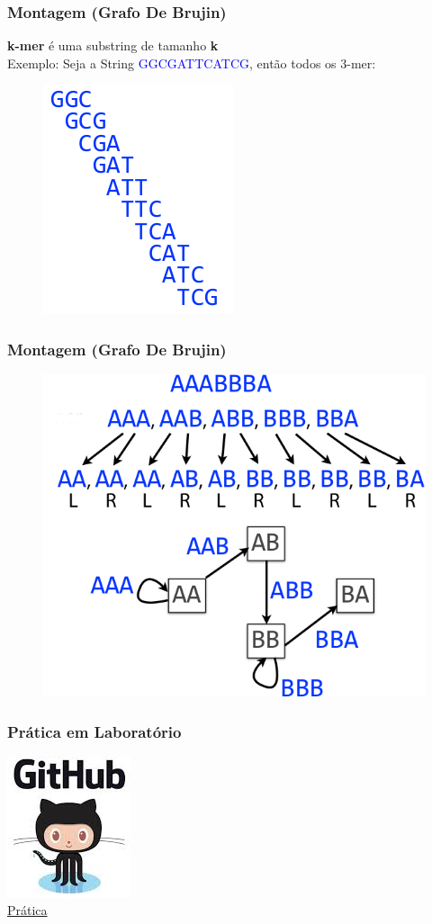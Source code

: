 \documentclass{beamer}
\begin{document}
		\begin{frame}\frametitle{Montagem (Grafo De Brujin)}
			\textbf{k-mer} é uma substring de tamanho \textbf{k}\\
			Exemplo: Seja a String \textcolor{blue}{GGCGATTCATCG}, então todos os 3-mer:
			\begin{figure}[ht]
				\centering
				\includegraphics[width=.34\textwidth]{img/3-mer.png}
			\end{figure}
		\end{frame}
	
		\begin{frame}\frametitle{Montagem (Grafo De Brujin)}
		\begin{figure}[ht]
			\centering
			\includegraphics[width=.75\textwidth]{img/debrujinresume.png}
		\end{figure}
		\end{frame}
	
		\begin{frame}\frametitle{Prática em Laboratório}
		\centering
		\href{https://github.com/waldeyr/bsb2018}{\includegraphics[scale=0.5]{img/git.png}\\Prática}
		\end{frame}
	
		
\end{document}
